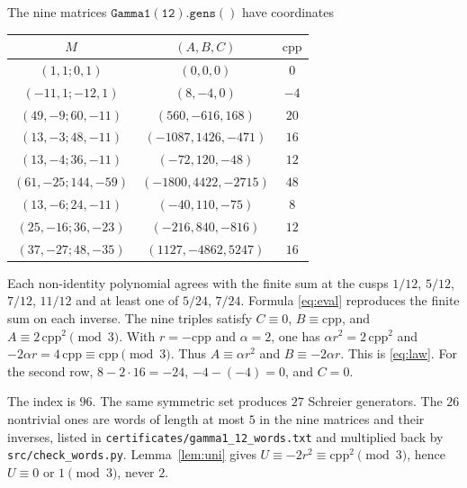\documentclass[11pt]{article}
\theoremstyle{remark}
\begin{document}
The nine matrices \(\mathtt{Gamma1(12).gens()}\) have coordinates

\begin{center}
\begin{tabular}{ccc}
\hline
\(M\) & \((A,B,C)\) & \(\mathrm{cpp}\) \\
\hline
\((1,1;0,1)\) & \((0,0,0)\) & \(0\) \\
\((-11,1;-12,1)\) & \((8,-4,0)\) & \(-4\) \\
\((49,-9;60,-11)\) & \((560,-616,168)\) & \(20\) \\
\((13,-3;48,-11)\) & \((-1087,1426,-471)\) & \(16\) \\
\((13,-4;36,-11)\) & \((-72,120,-48)\) & \(12\) \\
\((61,-25;144,-59)\) & \((-1800,4422,-2715)\) & \(48\) \\
\((13,-6;24,-11)\) & \((-40,110,-75)\) & \(8\) \\
\((25,-16;36,-23)\) & \((-216,840,-816)\) & \(12\) \\
\((37,-27;48,-35)\) & \((1127,-4862,5247)\) & \(16\) \\
\hline
\end{tabular}
\end{center}

Each non-identity polynomial agrees with the finite sum at the cusps \(1/12\), \(5/12\), \(7/12\), \(11/12\) and at least one of \(5/24\), \(7/24\).
Formula \eqref{eq:eval} reproduces the finite sum on each inverse.
The nine triples satisfy \(C\equiv 0\), \(B\equiv\mathrm{cpp}\), and \(A\equiv 2\,\mathrm{cpp}^2\pmod{3}\).
With \(r=-\mathrm{cpp}\) and \(\alpha=2\), one has \(\alpha r^2=2\,\mathrm{cpp}^2\) and \(-2\alpha r=4\,\mathrm{cpp}\equiv\mathrm{cpp}\pmod{3}\).
Thus \(A\equiv\alpha r^2\) and \(B\equiv -2\alpha r\).
This is \eqref{eq:law}.
For the second row, \(8-2\cdot 16=-24\), \(-4-(-4)=0\), and \(C=0\).

The index is \(96\).
The same symmetric set produces \(27\) Schreier generators.
The \(26\) nontrivial ones are words of length at most \(5\) in the nine matrices and their inverses, listed in \texttt{certificates/gamma1\_12\_words.txt} and multiplied back by \texttt{src/check\_words.py}.
Lemma~\ref{lem:uni} gives \(U\equiv -2r^2\equiv \mathrm{cpp}^2\pmod{3}\), hence \(U\equiv 0\) or \(1\pmod{3}\), never \(2\).
\end{document}
